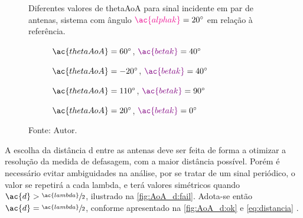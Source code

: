 \begin{figure}
    \caption{Diferentes valores de \ac{thetaAoA} para sinal incidente em par de antenas, sistema com ângulo $\textcolor{cmyk_M}{\ac{alphak}}=\SI{20}{\degree}$ em relação à referência.}
    \label{fig:AoA}

    \hfill
    \begin{subfigure}[b]{0.45\textwidth}
        \centering
        \caption{$ \ac{thetaAoA} = \SI{60}{\degree} $, $ \textcolor{Purple}{\ac{betak}} = \SI{40}{\degree} $}
        
        \label{fig:AoA:1}
    \end{subfigure}
    \hfill
    \begin{subfigure}[b]{0.45\textwidth}
        \centering
        \caption{$ \ac{thetaAoA} = \SI{-20}{\degree} $, $ \textcolor{Purple}{\ac{betak}} = \SI{40}{\degree} $}
        
        \label{fig:AoA:2}
    \end{subfigure}
    \hfill

    \vspace{\floatsep}

    \hfill
    \begin{subfigure}[b]{0.45\textwidth}
        \centering
        \caption{ $\ac{thetaAoA}=\SI{110}{\degree} $, $ \textcolor{Purple}{\ac{betak}} = \SI{90}{\degree} $}
        
        \label{fig:AoA:3}
    \end{subfigure}
    \hfill
    \begin{subfigure}[b]{0.45\textwidth}
        \centering
        \caption{$ \ac{thetaAoA}=\SI{20}{\degree} $, $ \textcolor{Purple}{\ac{betak}} = \SI{0}{\degree} $}
        
        \label{fig:AoA:4}
    \end{subfigure}
    \hfill

    \caption*{Fonte: Autor.}
\end{figure}


A escolha da distância \ac{d} entre as antenas deve ser feita de forma a otimizar a resolução da medida de defasagem, com a maior distância possível. Porém é necessário evitar ambiguidades na análise, por se tratar de um sinal periódico, o valor se repetirá a cada \ac{lambda}, e terá valores simétricos quando $\ac{d} > \sfrac{\ac{lambda}}{2}$, ilustrado na \autoref{fig:AoA_d:fail}.
Adota-se então $\ac{d}=\sfrac{\ac{lambda}}{2}$, conforme apresentado na \autoref{fig:AoA_d:ok} e \autoref{eq:distancia} \cite{bensky2016wireless, horst2021localization, Schssel2016AngleOA}.

